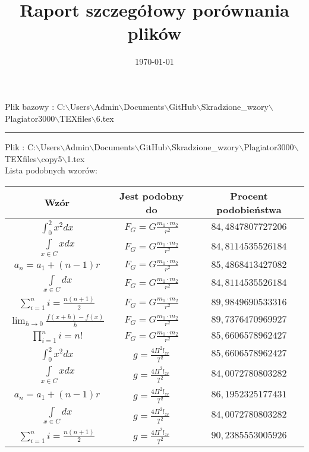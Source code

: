 \documentclass{article}
\begin{document}
\title{\huge\bfseries Raport szczegółowy porównania plików }
\date{\today}
\maketitle
\begin{flushleft}
Plik bazowy : C:$\backslash$Users$\backslash$Admin$\backslash$Documents$\backslash$GitHub$\backslash$Skradzione\_wzory$\backslash$Plagiator3000$\backslash$TEXfiles$\backslash$6.tex
\end{flushleft}
\hrule
\begin{flushleft}
Plik : C:$\backslash$Users$\backslash$Admin$\backslash$Documents$\backslash$GitHub$\backslash$Skradzione\_wzory$\backslash$Plagiator3000$\backslash$TEXfiles$\backslash$copy5$\backslash$1.tex\\ 
Lista podobnych wzorów: \\ 
\begin{longtable}{|c|c|c|} 
 \hline 
 Wzór & Jest podobny do & Procent podobieństwa \\ \hline  
$\int _0^2x^2dx$ & $F_{G}=G\frac{m_1\cdot m_2}{r^2}$ & $84,4847807727206$ \\ \hline 
$\int \limits_{x\in C}xdx$ & $F_{G}=G\frac{m_1\cdot m_2}{r^2}$ & $84,8114535526184$ \\ \hline 
$a_{n}=a_{1}+(n-1)r$ & $F_{G}=G\frac{m_1\cdot m_2}{r^2}$ & $85,4868413427082$ \\ \hline 
$\int \limits_{x\in C}dx$ & $F_{G}=G\frac{m_1\cdot m_2}{r^2}$ & $84,8114535526184$ \\ \hline 
$\sum_{i=1}^{n}i=\frac{n(n+1)}{2}$ & $F_{G}=G\frac{m_1\cdot m_2}{r^2}$ & $89,9849690533316$ \\ \hline 
$\lim_{h\to0}\frac{f(x+h)-f(x)}{h}$ & $F_{G}=G\frac{m_1\cdot m_2}{r^2}$ & $89,7376470969927$ \\ \hline 
$\prod_{i=1}^ni=n!$ & $F_{G}=G\frac{m_1\cdot m_2}{r^2}$ & $85,6606578962427$ \\ \hline 
$\int _0^2x^2dx$ & $g=\frac{4\Pi ^2l_{zr}}{T^2}$ & $85,6606578962427$ \\ \hline 
$\int \limits_{x\in C}xdx$ & $g=\frac{4\Pi ^2l_{zr}}{T^2}$ & $84,0072780803282$ \\ \hline 
$a_{n}=a_{1}+(n-1)r$ & $g=\frac{4\Pi ^2l_{zr}}{T^2}$ & $86,1952325177431$ \\ \hline 
$\int \limits_{x\in C}dx$ & $g=\frac{4\Pi ^2l_{zr}}{T^2}$ & $84,0072780803282$ \\ \hline 
$\sum_{i=1}^{n}i=\frac{n(n+1)}{2}$ & $g=\frac{4\Pi ^2l_{zr}}{T^2}$ & $90,2385553005926$ \\ \hline 

\end{longtable}
\end{flushleft}
\end{document}
